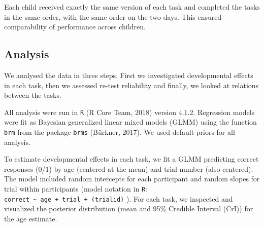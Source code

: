 \documentclass[
  english,
  man,floatsintext]{apa6}
\begin{document}
Each child received exactly the same version of each task and completed the tasks in the same order, with the same order on the two days. This ensured comparability of performance across children.

\hypertarget{analysis}{%
\subsection{Analysis}\label{analysis}}

We analysed the data in three steps. First we investigated developmental effects in each task, then we assessed re-test reliability and finally, we looked at relations between the tasks.

All analysis were run in \texttt{R} (R Core Team, 2018) version 4.1.2. Regression models were fit as Bayesian generalized linear mixed models (GLMM) using the function \texttt{brm} from the package \texttt{brms} (Bürkner, 2017). We used default priors for all analysis.

To estimate developmental effects in each task, we fit a GLMM predicting correct responses (0/1) by age (centered at the mean) and trial number (also centered). The model included random intercepts for each participant and random slopes for trial within participants (model notation in \texttt{R}: \texttt{correct\ \textasciitilde{}\ age\ +\ trial\ +\ (trial\textbar{}id)} ). For each task, we inspected and visualized the posterior distribution (mean and 95\% Credible Interval (CrI)) for the age estimate.
\end{document}
